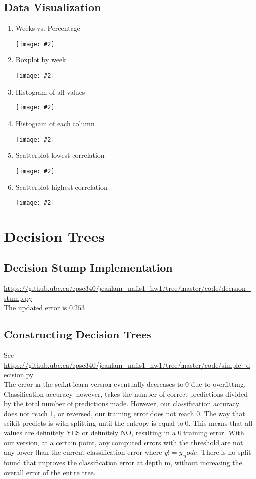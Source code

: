 \documentclass{article}
\newcommand{\fig}[2]{\texttt{[image: \#2]}}
\begin{document}
\subsection{Data Visualization}
\begin{enumerate}
\item Weeks vs. Percentage \begin{center}
\fig{0.55}{../figs/q1_2_1.png} %
\end{center}
\item Boxplot by week \begin{center}
\fig{0.55}{../figs/q1_2_2.png} %
\end{center}
\item Histogram of all values \begin{center}
\fig{0.55}{../figs/q1_2_3.png} %
\end{center}
\item Histogram of each column \begin{center}
\fig{0.55}{../figs/q1_2_4.png} %
\end{center}
\item Scatterplot lowest correlation \begin{center}
\fig{0.55}{../figs/q1_2_5.png} %
\end{center}
\item Scatterplot highest correlation \begin{center}
\fig{0.55}{../figs/q1_2_6.png} %
\end{center}
\end{enumerate}

\section{Decision Trees}
\subsection{Decision Stump Implementation}
\url{https://github.ubc.ca/cpsc340/jeanlam_nafis1_hw1/tree/master/code/decision_stump.py} \\
The updated error is $0.253$
\subsection{Constructing Decision Trees}
See \url{https://github.ubc.ca/cpsc340/jeanlam_nafis1_hw1/tree/master/code/simple_decision.py} \\
The error in the scikit-learn version eventually decreases to 0 due to overfitting. Classification accuracy, however, takes the number of correct predictions divided by the total number of predictions made. However, our classification accuracy does not reach 1, or reversed, our training error does not reach 0. The way that scikit predicts is with splitting until the entropy is equal to 0. This means that all values are definitely YES or definitely NO, resulting in a 0 training error. With our version, at a certain point, any computed errors with the threshold are not any lower than the current classification error where $y != y_mode$. There is no split found that improves the classification error at depth m, without increasing the overall error of the entire tree. 
\end{document}
